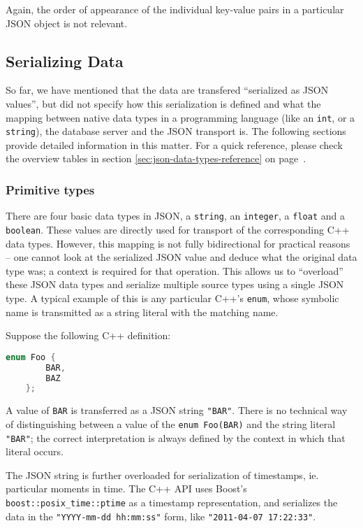\documentclass{article}
\begin{document}
Again, the order of appearance of the individual key-value pairs in a particular JSON object is not relevant.

\subsection{Serializing Data}

So far, we have mentioned that the data are transfered ``serialized as JSON values'', but did not specify how this
serialization is defined and what the mapping between native data types in a programming language (like an {\tt int}, or
a {\tt string}), the database server and the JSON transport is.  The following sections provide detailed information in
this matter.  For a quick reference, please check the overview tables in section \ref{sec:json-data-types-reference} on
page~\pageref{sec:json-data-types-reference}.

\subsubsection{Primitive types}

There are four basic data types in JSON, a {\tt string}, an {\tt integer}, a {\tt float} and a {\tt boolean}.  These
values are directly used for transport of the corresponding C++ data types.  However, this mapping is not fully
bidirectional for practical reasons -- one cannot look at the serialized JSON value and deduce what the original data
type was; a context is required for that operation.  This allows us to ``overload'' these JSON data types and serialize
multiple source types using a single JSON type.  A typical example of this is any particular C++'s {\tt enum}, whose
symbolic name is transmitted as a string literal with the matching name.

Suppose the following C++ definition:

\begin{lstlisting}[language=c++]
    enum Foo {
        BAR,
        BAZ
    };
\end{lstlisting}

A value of {\tt BAR} is transferred as a JSON string {\tt "BAR"}.  There is no technical way of distinguishing between
a value of the {\tt enum Foo(BAR)} and the string literal {\tt "BAR"}; the correct interpretation is always defined by
the context in which that literal occurs.

The JSON string is further overloaded for serialization of timestamps, ie. particular moments in time.  The C++ API uses
Boost's {\tt boost::posix\_time::ptime} as a timestamp representation, and serializes the data in the {\tt "YYYY-mm-dd
hh:mm:ss"} form, like {\tt "2011-04-07 17:22:33"}.
\end{document}
